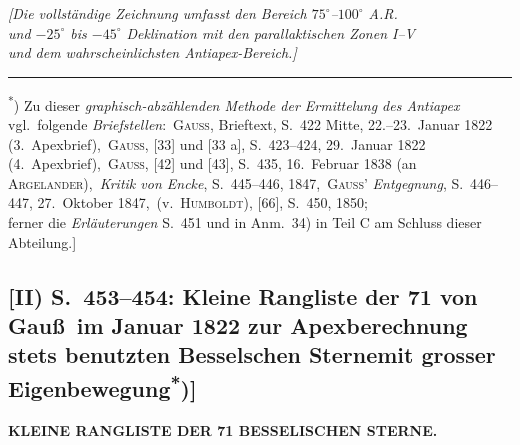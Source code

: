 \documentclass[12pt,a4paper]{article}
\theoremstyle{plain}
\theoremstyle{definition}
\theoremstyle{remark}
\begin{document}
\medskip
\begin{center}
\textit{[Die vollst\"andige Zeichnung umfasst den Bereich $75^{\circ}$--$100^{\circ}$ A.R.\\
und $-25^{\circ}$ bis $-45^{\circ}$ Deklination mit den parallaktischen Zonen I--V\\
und dem wahrscheinlichsten Antiapex-Bereich.]}
\end{center}
\medskip

\noindent\rule{\textwidth}{0.4pt}
\begin{small}
\textsuperscript{*}) Zu dieser \textit{graphisch-abz\"ahlenden Methode der Ermittelung des Antiapex}
vgl.~folgende \textit{Briefstellen}:\
\textsc{Gau\ss}, Brieftext, S.~422 Mitte, 22.--23.~Januar 1822 (3.~Apexbrief),\
\textsc{Gau\ss}, [33] und [33 a], S.~423--424, 29.~Januar 1822 (4.~Apexbrief),\
\textsc{Gau\ss}, [42] und [43], S.~435, \hspace{1cm} 16.~Februar 1838 (an \textsc{Argelander}),\
\textit{Kritik von Encke}, S.~445--446, \hspace{2.2cm} 1847,\
\textsc{Gau\ss'} \textit{Entgegnung}, S.~446--447, 27.~Oktober 1847,\
(v.~\textsc{Humboldt}), [66], S.~450, \hspace{1.8cm} 1850;\\
ferner die \textit{Erl\"auterungen} S.~451 und in Anm.~34) in Teil C am Schluss dieser Abteilung.]
\end{small}

\newpage
\subsection*{[II) S.~453--454: Kleine Rangliste der 71 von Gau\ss\ im Januar 1822 zur Apexberechnung stets benutzten \glqq Besselschen Sterne\grqq mit grosser Eigenbewegung\textsuperscript{*})]}

\begin{center}
\textbf{KLEINE RANGLISTE DER 71 BESSELISCHEN STERNE.}
\end{center}
\end{document}
